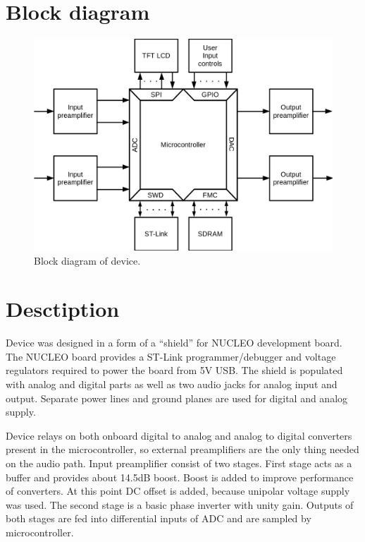 \documentclass[a4paper,twoside,12pt]{book}
\begin{document}
\section{Block diagram}

\begin{figure}[H]
    \centering
    \includegraphics[width=\textwidth]{images/Block}
    \caption{Block diagram of device.}
    \label{fig:block}
\end{figure}

\section{Desctiption}
Device was designed in a form of a “shield” for NUCLEO development board.
The NUCLEO board provides a ST-Link programmer/debugger
and voltage regulators required to power the board from 5V USB.
The shield is populated with analog and digital parts
as well as two audio jacks for analog input and output.
Separate power lines and ground planes are used for digital and analog supply.

Device relays on both onboard digital to analog
and analog to digital converters present in the microcontroller,
so external preamplifiers are the only thing needed on the audio path.
Input preamplifier consist of two stages.
First stage acts as a buffer and provides about 14.5dB boost.
Boost is added to improve performance of converters.
At this point DC offset is added, because unipolar voltage supply was used.
The second stage is a basic phase inverter with unity gain.
Outputs of both stages are fed into differential inputs of ADC
and are sampled by microcontroller.
\end{document}
